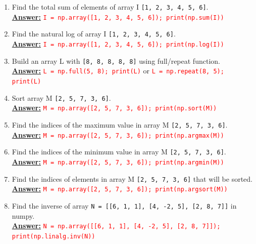 \documentclass{book}
\begin{document}
\begin{enumerate}
    \vspace{1.5mm}
    \item Find the total sum of elements of array I \texttt{[1, 2, 3, 4, 5, 6]}.\\
    \underline{\textbf{Answer:}} \textcolor{red}{\texttt{I = np.array([1, 2, 3, 4, 5, 6]); print(np.sum(I))}}
    \vspace{1.5mm}
    \item Find the natural log of array I \texttt{[1, 2, 3, 4, 5, 6]}.\\
    \underline{\textbf{Answer:}} \textcolor{red}{\texttt{I = np.array([1, 2, 3, 4, 5, 6]); print(np.log(I))}}
    \vspace{1.5mm}
    \item Build an array L with \texttt{[8, 8, 8, 8, 8]} using full/repeat function.\\
    \underline{\textbf{Answer:}} \textcolor{red}{\texttt{L = np.full(5, 8); print(L)}} or \textcolor{red}{\texttt{L = np.repeat(8, 5); print(L)}}
    \vspace{1.5mm}
    \item Sort array M \texttt{[2, 5, 7, 3, 6]}.\\
    \underline{\textbf{Answer:}} \textcolor{red}{\texttt{M = np.array([2, 5, 7, 3, 6]); print(np.sort(M))}}
    \vspace{1.5mm}
    \item Find the indices of the maximum value in array M \texttt{[2, 5, 7, 3, 6]}.\\
    \underline{\textbf{Answer:}} \textcolor{red}{\texttt{M = np.array([2, 5, 7, 3, 6]); print(np.argmax(M))}}
    \vspace{1.5mm}
    \item Find the indices of the minimum value in array M \texttt{[2, 5, 7, 3, 6]}.\\
    \underline{\textbf{Answer:}} \textcolor{red}{\texttt{M = np.array([2, 5, 7, 3, 6]); print(np.argmin(M))}}
    \vspace{1.5mm}
    \item Find the indices of elements in array M \texttt{[2, 5, 7, 3, 6]} that will be sorted.\\
    \underline{\textbf{Answer:}} \textcolor{red}{\texttt{M = np.array([2, 5, 7, 3, 6]); print(np.argsort(M))}}
    \vspace{1.5mm}
    \item Find the inverse of array \texttt{N = [[6, 1, 1], [4, -2, 5], [2, 8, 7]]} in numpy.\\
    \underline{\textbf{Answer:}} \textcolor{red}{\texttt{N = np.array([[6, 1, 1], [4, -2, 5], [2, 8, 7]]); print(np.linalg.inv(N))}}

\end{enumerate}
\end{document}
